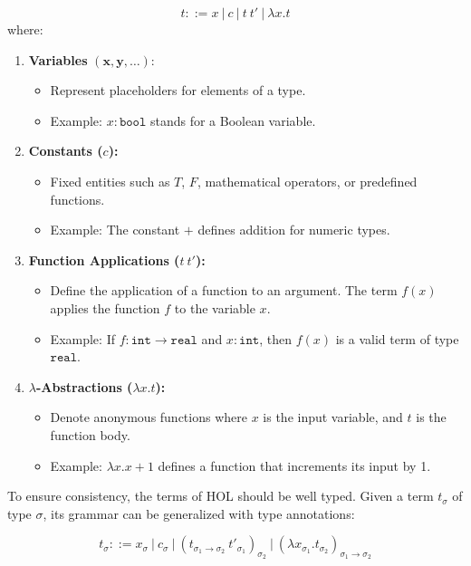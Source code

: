 \[
t ::= x \ | \ c \ | \ t \ t' \ | \ \lambda x. t
\]
where:
\begin{enumerate}
\item \textbf{Variables} $\boldsymbol{(x, y, \ldots)}:$
    \begin{itemize}
        \item Represent placeholders for elements of a type.
        \item Example: \(x : \texttt{bool}\) stands for a Boolean variable.
    \end{itemize}

    \item \textbf{Constants (\(c\)):}
    \begin{itemize}
        \item Fixed entities such as \(T\), \(F\), mathematical operators, or predefined functions.
        \item  Example: The constant \(+\) defines addition for numeric types.
    \end{itemize}

   \item \textbf{Function Applications (\(t \ t'\)):}
   \begin{itemize}
       \item Define the application of a function to an argument. The term \(f(x)\) applies the function \(f\) to the variable \(x\).
        \item Example: If \(f : \texttt{int} \to \texttt{real}\) and \(x : \texttt{int}\), then \(f(x)\) is a valid term of type \(\texttt{real}\).
   \end{itemize}

\item \textbf{\(\lambda\)-Abstractions (\(\lambda x. t\)):}
\begin{itemize}
    \item Denote anonymous functions where \(x\) is the input variable, and \(t\) is the function body.
    \item Example: \(\lambda x. x + 1\) defines a function that increments its input by 1.
\end{itemize}


\end{enumerate}

To ensure consistency, the terms of HOL should be well typed. Given a term \(t_{\sigma}\) of type \(\sigma\), its grammar can be generalized with type annotations:

\[
t_{\sigma} ::= x_{\sigma} \ | \ c_{\sigma} \ | \ (t_{\sigma_1 \to \sigma_2} \ t'_{\sigma_1})_{\sigma_2} \ | \ (\lambda x_{\sigma_1}. t_{\sigma_2})_{\sigma_1 \to \sigma_2}
\]

